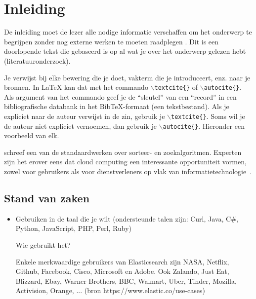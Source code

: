 
\chapter{Inleiding}
\label{ch:inleiding}

De inleiding moet de lezer alle nodige informatie verschaffen om het onderwerp te begrijpen zonder nog externe werken te moeten raadplegen \autocite{Pollefliet2011}. Dit is een doorlopende tekst die gebaseerd is op al wat je over het onderwerp gelezen hebt (literatuuronderzoek).

Je verwijst bij elke bewering die je doet, vakterm die je introduceert, enz. naar je bronnen. In \LaTeX{} kan dat met het commando \texttt{$\backslash${textcite\{\}}} of \texttt{$\backslash${autocite\{\}}}. Als argument van het commando geef je de ``sleutel'' van een ``record'' in een bibliografische databank in het Bib\TeX{}-formaat (een tekstbestand). Als je expliciet naar de auteur verwijst in de zin, gebruik je \texttt{$\backslash${}textcite\{\}}.
Soms wil je de auteur niet expliciet vernoemen, dan gebruik je \texttt{$\backslash${}autocite\{\}}. Hieronder een voorbeeld van elk.

\textcite{Knuth1998} schreef een van de standaardwerken over sorteer- en zoekalgoritmen. Experten zijn het erover eens dat cloud computing een interessante opportuniteit vormen, zowel voor gebruikers als voor dienstverleners op vlak van informatietechnologie~\autocite{Creeger2009}.



\section{Stand van zaken}
\label{sec:stand-van-zaken}


\begin{itemize}
	\item Gebruiken in de taal die je wilt (ondersteunde talen zijn: Curl, Java, C\#, Python, JavaScript, PHP, Perl, Ruby)
	
	Wie gebruikt het? 
	
	Enkele merkwaardige gebruikers van Elasticsearch zijn NASA, Netflix, Github, Facebook, Cisco, Microsoft en Adobe. Ook Zalando, Just Eat, Blizzard, Ebay, Warner Brothers, BBC, Walmart, Uber, Tinder, Mozilla, Activision, Orange, ... (bron https://www.elastic.co/use-cases)
	
\end{itemize}


